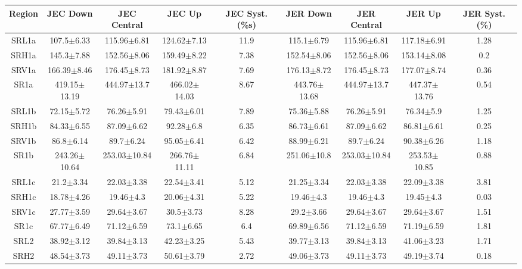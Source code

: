\documentclass[12pt]{paper}
\begin{document}
\begin{table}[ht]\begin{center}\resizebox{\textwidth}{!}
{\begin{tabular}{c|ccc|c|ccc|c}
    Region & JEC Down & JEC Central & JEC Up & JEC Syst. (\%s) & JER Down & JER Central & JER Up & JER Syst. (\%) \\ 
\hline
SRL1a & 107.5$\pm$6.33 & 115.96$\pm$6.81 & 124.62$\pm$7.13 & 11.9 & 115.1$\pm$6.79 & 115.96$\pm$6.81 & 117.18$\pm$6.91 & 1.28\\ 
SRH1a & 145.3$\pm$7.88 & 152.56$\pm$8.06 & 159.49$\pm$8.22 & 7.38 & 152.54$\pm$8.06 & 152.56$\pm$8.06 & 153.14$\pm$8.08 & 0.2\\ 
SRV1a & 166.39$\pm$8.46 & 176.45$\pm$8.73 & 181.92$\pm$8.87 & 7.69 & 176.13$\pm$8.72 & 176.45$\pm$8.73 & 177.07$\pm$8.74 & 0.36\\ 
\hline
SR1a & 419.15$\pm$13.19 & 444.97$\pm$13.7 & 466.02$\pm$14.03 & 8.67 & 443.76$\pm$13.68 & 444.97$\pm$13.7 & 447.37$\pm$13.76 & 0.54\\ 
\hline
SRL1b & 72.15$\pm$5.72 & 76.26$\pm$5.91 & 79.43$\pm$6.01 & 7.89 & 75.36$\pm$5.88 & 76.26$\pm$5.91 & 76.34$\pm$5.9 & 1.25\\ 
SRH1b & 84.33$\pm$6.55 & 87.09$\pm$6.62 & 92.28$\pm$6.8 & 6.35 & 86.73$\pm$6.61 & 87.09$\pm$6.62 & 86.81$\pm$6.61 & 0.25\\ 
SRV1b & 86.8$\pm$6.14 & 89.7$\pm$6.24 & 95.05$\pm$6.41 & 6.42 & 88.99$\pm$6.21 & 89.7$\pm$6.24 & 90.38$\pm$6.26 & 1.18\\ 
\hline
SR1b & 243.26$\pm$10.64 & 253.03$\pm$10.84 & 266.76$\pm$11.11 & 6.84 & 251.06$\pm$10.8 & 253.03$\pm$10.84 & 253.53$\pm$10.85 & 0.88\\ 
\hline
SRL1c & 21.2$\pm$3.34 & 22.03$\pm$3.38 & 22.54$\pm$3.41 & 5.12 & 21.25$\pm$3.34 & 22.03$\pm$3.38 & 22.09$\pm$3.38 & 3.81\\ 
SRH1c & 18.78$\pm$4.26 & 19.46$\pm$4.3 & 20.06$\pm$4.31 & 5.22 & 19.46$\pm$4.3 & 19.46$\pm$4.3 & 19.45$\pm$4.3 & 0.03\\ 
SRV1c & 27.77$\pm$3.59 & 29.64$\pm$3.67 & 30.5$\pm$3.73 & 8.28 & 29.2$\pm$3.66 & 29.64$\pm$3.67 & 29.64$\pm$3.67 & 1.51\\ 
\hline
SR1c & 67.77$\pm$6.49 & 71.12$\pm$6.59 & 73.1$\pm$6.65 & 6.4 & 69.89$\pm$6.56 & 71.12$\pm$6.59 & 71.19$\pm$6.59 & 1.81\\ 
\hline
SRL2 & 38.92$\pm$3.12 & 39.84$\pm$3.13 & 42.23$\pm$3.25 & 5.43 & 39.77$\pm$3.13 & 39.84$\pm$3.13 & 41.06$\pm$3.23 & 1.71\\ 
SRH2 & 48.54$\pm$3.73 & 49.11$\pm$3.73 & 50.61$\pm$3.79 & 2.72 & 49.06$\pm$3.73 & 49.11$\pm$3.73 & 49.19$\pm$3.74 & 0.18\\ 

\end{tabular}}
\end{center}
\end{table}
\end{document}
